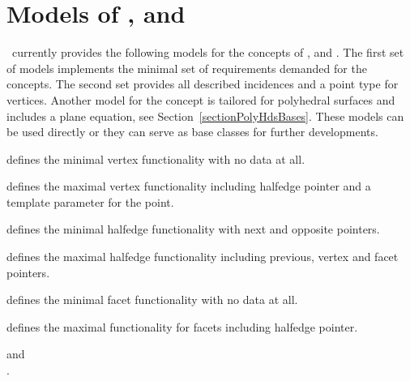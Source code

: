 \ccTagDefaults


\section{Models of \protect{},
  \protect{} and \protect{}}
\label{sectionHdsBasesModels}

\cgal\ currently provides the following models for the concepts of
,  and .  The
first set of models implements the minimal set of requirements
demanded for the concepts. The second set provides all described
incidences and a point type for vertices. Another model for the
 concept is tailored for polyhedral surfaces and
includes a plane equation, see Section~\ref{sectionPolyHdsBases}.
These models can be used directly or they can serve as base classes
for further developments.



    {defines the minimal vertex functionality with no data at all.}

    {defines the maximal vertex functionality including halfedge
      pointer and a template parameter for the point.}

    {defines the minimal halfedge functionality with next and opposite
      pointers.}

    {defines the maximal halfedge functionality including previous,
      vertex and facet pointers.}

    {defines the minimal facet functionality with no data at all.}

    {defines the maximal functionality for facets including halfedge pointer.}


\ccSeeAlso

 and\\
.



